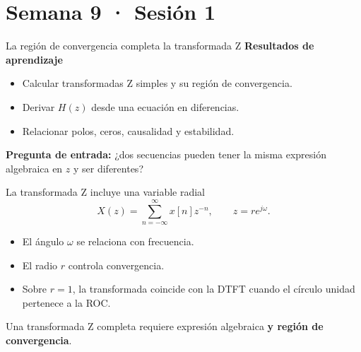 \documentclass[
  ignorenonframetext,
  aspectratio=169,
  spanish,
  professionalfonts]{beamer}
\providecommand{\tightlist}{%
  \setlength{\itemsep}{0pt}\setlength{\parskip}{0pt}}
\begin{document}
\section{Semana 9 · Sesión 1}\label{semana-9-sesiuxf3n-1}

\begin{frame}{La región de convergencia completa la transformada Z}
\protect{}\label{la-regiuxf3n-de-convergencia-completa-la-transformada-z}
\textbf{Resultados de aprendizaje}

\begin{itemize}
\tightlist
\item
  Calcular transformadas Z simples y su región de convergencia.
\item
  Derivar \(H(z)\) desde una ecuación en diferencias.
\item
  Relacionar polos, ceros, causalidad y estabilidad.
\end{itemize}

\textbf{Pregunta de entrada:} ¿dos secuencias pueden tener la misma
expresión algebraica en \(z\) y ser diferentes?
\end{frame}

\begin{frame}{La transformada Z incluye una variable radial}
\protect{}\label{la-transformada-z-incluye-una-variable-radial}
\[
X(z)=\sum_{n=-\infty}^{\infty}x[n]z^{-n},
\qquad z=re^{j\omega}.
\]

\begin{itemize}
\tightlist
\item
  El ángulo \(\omega\) se relaciona con frecuencia.
\item
  El radio \(r\) controla convergencia.
\item
  Sobre \(r=1\), la transformada coincide con la DTFT cuando el círculo
  unidad pertenece a la ROC.
\end{itemize}

\begin{tcolorbox}[enhanced jigsaw, arc=.35mm, bottomrule=.15mm, bottomtitle=1mm, breakable, colback=white, colbacktitle=quarto-callout-important-color!10!white, colframe=quarto-callout-important-color-frame, coltitle=black, left=2mm, leftrule=.75mm, opacityback=0, opacitybacktitle=0.6, rightrule=.15mm, title={Concepto principal}, titlerule=0mm, toprule=.15mm, toptitle=1mm]

Una transformada Z completa requiere expresión algebraica \textbf{y
región de convergencia}.

\end{tcolorbox}
\end{frame}
\end{document}
